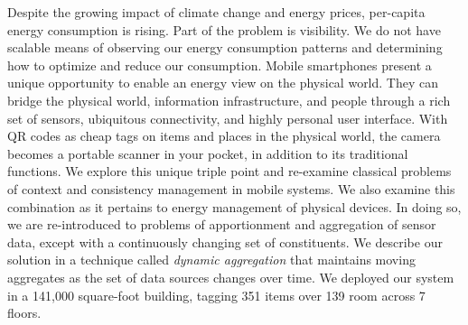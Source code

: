Despite the growing impact of climate change and energy prices, 
per-capita energy consumption is rising. Part of the problem is visibility. We do not 
have scalable means of observing our energy consumption patterns and determining how to optimize and reduce our
consumption.
Mobile smartphones present a unique opportunity to enable an energy view on the physical world. 
They can bridge the physical world, information infrastructure, and people
through a rich set of sensors, ubiquitous connectivity, and highly personal user interface. 
With QR codes as cheap tags on items and places in the physical world, the
camera becomes a portable scanner in your pocket, in addition to its
traditional functions.  We explore this
unique triple point
and re-examine classical problems of context and consistency management in mobile
systems.  We also examine this combination as it pertains to energy management of physical
devices.  In doing so, we are re-introduced to problems of apportionment and aggregation of sensor data,
except with a continuously changing set of constituents.  We describe our solution in a technique
called \emph{dynamic aggregation} that maintains moving aggregates as the
set of data sources changes over time.  We deployed our system in a 
141,000 square-foot building, tagging 351 items over 139 room across 7 floors.




